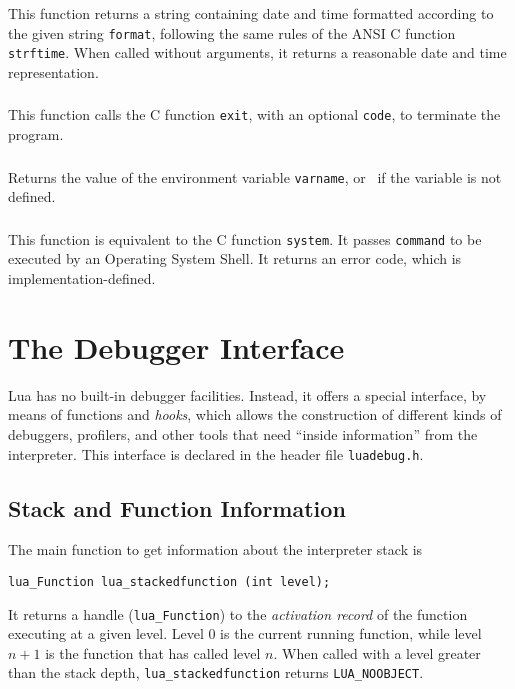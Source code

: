This function returns a string containing date and time
formatted according to the given string \verb'format',
following the same rules of the ANSI C function \verb'strftime'.
When called without arguments,
it returns a reasonable date and time representation.

\subsubsection*{}

This function calls the C function \verb-exit-,
with an optional \verb-code-,
to terminate the program.

\subsubsection*{}

Returns the value of the environment variable \verb|varname|,
or \nil\ if the variable is not defined.

\subsubsection*{}

This function is equivalent to the C function \verb|system|.
It passes \verb|command| to be executed by an Operating System Shell.
It returns an error code, which is implementation-defined.


\section{The Debugger Interface} \label{debugI}

Lua has no built-in debugger facilities.
Instead, it offers a special interface,
by means of functions and {\em hooks},
which allows the construction of different
kinds of debuggers, profilers, and other tools
that need ``inside information'' from the interpreter.
This interface is declared in the header file \verb'luadebug.h'.

\subsection{Stack and Function Information}

The main function to get information about the interpreter stack
is
\begin{verbatim}
lua_Function lua_stackedfunction (int level);
\end{verbatim}
It returns a handle (\verb'lua_Function') to the {\em activation record\/}
of the function executing at a given level.
Level 0 is the current running function,
while level $n+1$ is the function that has called level $n$.
When called with a level greater than the stack depth,
\verb'lua_stackedfunction' returns \verb'LUA_NOOBJECT'.

